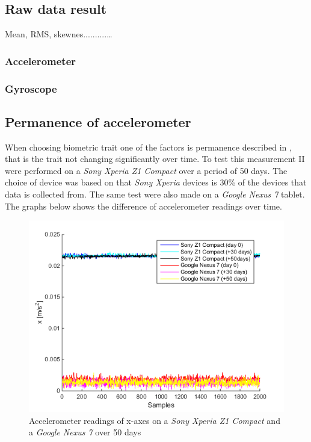 \subsection{Raw data result}
Mean, RMS, skewnes..........\dots

\subsubsection{Accelerometer}

\subsubsection{Gyroscope}

\subsection{Permanence of accelerometer}
When choosing biometric trait one of the factors is permanence described in , that is the trait not changing significantly over time. To test this measurement II were performed on a \textit{Sony Xperia Z1 Compact} over a period of 50 days. The choice of device was based on that \textit{Sony Xperia} devices is 30\% of the devices that data is collected from. The same test were also made on a \textit{Google Nexus 7} tablet. The graphs below shows the difference of accelerometer readings over time.
\begin{figure}[H]
	\centering
	\includegraphics[scale=.7]{img/sensrec-nex-z1-acc-x}
	\caption{Accelerometer readings of x-axes on a  \textit{Sony Xperia Z1 Compact} and a \textit{Google Nexus 7} over 50 days}
	\label{fig:x50days}
\end{figure}
